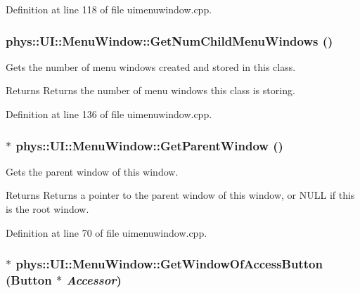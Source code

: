 Definition at line 118 of file uimenuwindow.cpp.

\hypertarget{classphys_1_1UI_1_1MenuWindow_ab3a6ae708ba2cea16cd0de176e265459}{
\subsubsection[{GetNumChildMenuWindows}]{ phys::UI::MenuWindow::GetNumChildMenuWindows ()}}
\label{d4/d07/classphys_1_1UI_1_1MenuWindow_ab3a6ae708ba2cea16cd0de176e265459}


Gets the number of menu windows created and stored in this class. 

\begin{DoxyReturn}{Returns}
Returns the number of menu windows this class is storing. 
\end{DoxyReturn}


Definition at line 136 of file uimenuwindow.cpp.

\hypertarget{classphys_1_1UI_1_1MenuWindow_ac47ccc564f09ac33e13e56860b6ae281}{
\subsubsection[{GetParentWindow}]{ $\ast$ phys::UI::MenuWindow::GetParentWindow ()}}
\label{d4/d07/classphys_1_1UI_1_1MenuWindow_ac47ccc564f09ac33e13e56860b6ae281}


Gets the parent window of this window. 

\begin{DoxyReturn}{Returns}
Returns a pointer to the parent window of this window, or NULL if this is the root window. 
\end{DoxyReturn}


Definition at line 70 of file uimenuwindow.cpp.

\hypertarget{classphys_1_1UI_1_1MenuWindow_a12b1586cd33bc03b5902018376878961}{
\subsubsection[{GetWindowOfAccessButton}]{ $\ast$ phys::UI::MenuWindow::GetWindowOfAccessButton ({\bf Button} $\ast$ {\em Accessor})}}
\label{d4/d07/classphys_1_1UI_1_1MenuWindow_a12b1586cd33bc03b5902018376878961}


